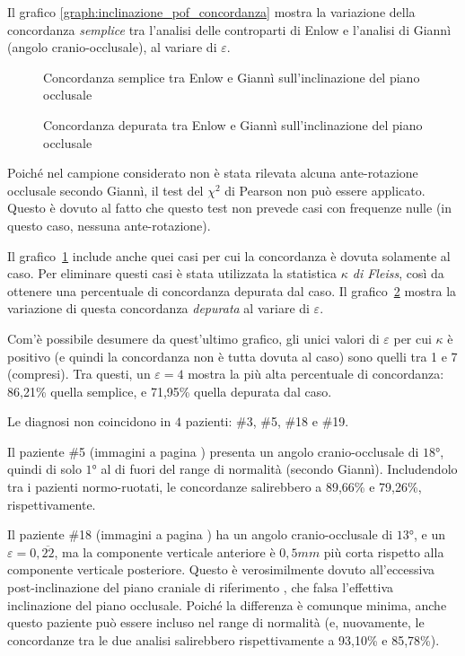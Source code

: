 Il grafico \vref{graph:inclinazione_pof_concordanza} mostra la variazione della concordanza \emph{semplice} tra l'analisi delle controparti di Enlow e l'analisi di Giannì (angolo cranio-occlusale), al variare di $\varepsilon$.

\begin{figure}[ht!]
\centering

\caption{Concordanza semplice tra Enlow e Giannì sull'inclinazione del piano occlusale}
\label{graph:inclinazione_pof_concordanza}
\end{figure}

\begin{figure}[ht!]
\centering

\caption{Concordanza depurata tra Enlow e Giannì sull'inclinazione del piano occlusale}
\label{graph:inclinazione_pof_kappa}
\end{figure}

Poiché nel campione considerato non è stata rilevata alcuna ante-rotazione occlusale secondo Giannì, il test del $\chi^2$ di Pearson non può essere applicato. Questo è dovuto al fatto che questo test non prevede casi con frequenze nulle (in questo caso, nessuna ante-rotazione).

Il grafico~\ref{graph:inclinazione_pof_concordanza} include anche quei casi per cui la concordanza è dovuta solamente al caso. Per eliminare questi casi è stata utilizzata la statistica \emph{$\kappa$ di Fleiss}, così da ottenere una percentuale di concordanza depurata dal caso. Il grafico~\ref{graph:inclinazione_pof_kappa} mostra la variazione di questa concordanza \emph{depurata} al variare di $\varepsilon$.

Com'è possibile desumere da quest'ultimo grafico, gli unici valori di $\varepsilon$ per cui $\kappa$ è positivo (e quindi la concordanza non è tutta dovuta al caso) sono quelli tra 1 e 7 (compresi). Tra questi, un $\varepsilon = 4$ mostra la più alta percentuale di concordanza: 86,21\% quella semplice, e 71,95\% quella depurata dal caso.

Le diagnosi non coincidono in $4$ pazienti: \#3, \#5, \#18 e \#19.

Il paziente \#5 (immagini a pagina \pageref{paz:EMALO2001}) presenta un angolo cranio-occlusale di $18°$, quindi di solo $1°$ al di fuori del range di normalità (secondo Giannì). Includendolo tra i pazienti normo-ruotati, le concordanze salirebbero a 89,66\% e 79,26\%, rispettivamente.

Il paziente \#18 (immagini a pagina \pageref{paz:TILO1999}) ha un angolo cranio-occlusale di $13°$, e un $\varepsilon = 0,\overline{22}$, ma la componente verticale anteriore è $0,5 mm$ più corta rispetto alla componente verticale posteriore. Questo è verosimilmente dovuto all'eccessiva post-inclinazione del piano craniale di riferimento , che falsa l'effettiva inclinazione del piano occlusale. Poiché la differenza è comunque minima, anche questo paziente può essere incluso nel range di normalità (e, nuovamente, le concordanze tra le due analisi salirebbero rispettivamente a 93,10\% e 85,78\%).

